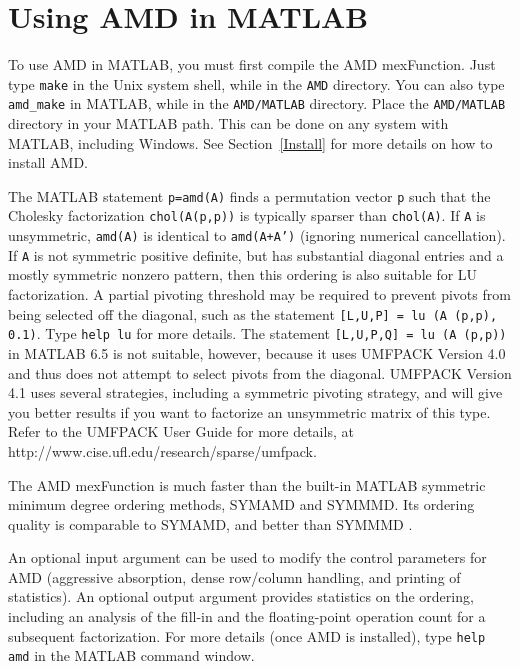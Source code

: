 \documentclass[11pt]{article}
\begin{document}
\section{Using AMD in MATLAB}

To use AMD in MATLAB, you must first compile the AMD mexFunction.
Just type {\tt make} in the Unix system shell, while in the {\tt AMD}
directory.  You can also type {\tt amd\_make} in MATLAB, while in the
{\tt AMD/MATLAB} directory.  Place the {\tt AMD/MATLAB} directory in your
MATLAB path.  This can be done on any system with MATLAB, including Windows.
See Section~\ref{Install} for more details on how to install AMD.

The MATLAB statement {\tt p=amd(A)} finds a permutation vector {\tt p} such
that the Cholesky factorization {\tt chol(A(p,p))} is typically sparser than
{\tt chol(A)}.
If {\tt A} is unsymmetric, {\tt amd(A)} is identical to {\tt amd(A+A')}
(ignoring numerical cancellation).
If {\tt A} is not symmetric positive definite,
but has substantial diagonal entries and a mostly symmetric nonzero pattern,
then this ordering is also suitable for LU factorization.  A partial pivoting
threshold may be required to prevent pivots from being selected off the
diagonal, such as the statement {\tt [L,U,P] = lu (A (p,p), 0.1)}.
Type {\tt help lu} for more details.
The statement {\tt [L,U,P,Q] = lu (A (p,p))} in MATLAB 6.5 is
not suitable, however, because it uses UMFPACK Version 4.0 and thus
does not attempt to select pivots from the diagonal.  UMFPACK Version 4.1
uses several strategies, including a symmetric pivoting strategy, and
will give you better results if you want to factorize an unsymmetric matrix
of this type.  Refer to the UMFPACK User Guide for more details, at
http://www.cise.ufl.edu/research/sparse/umfpack.

The AMD mexFunction is much faster than the built-in MATLAB symmetric minimum
degree ordering methods, SYMAMD and SYMMMD.  Its ordering quality is
comparable to SYMAMD, and better than SYMMMD
\cite{DavisGilbertLarimoreNg00pending}.

An optional input argument can be used to modify the control parameters for
AMD (aggressive absorption, dense row/column handling, and printing of
statistics).  An optional output
argument provides statistics on the ordering, including an analysis of the
fill-in and the floating-point operation count for a subsequent factorization.
For more details (once AMD is installed),
type {\tt help amd} in the MATLAB command window.
\end{document}
